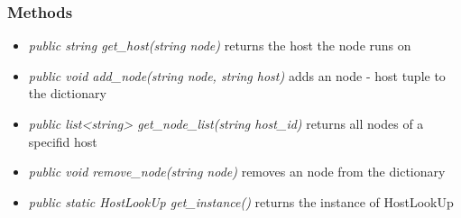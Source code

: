 \subsubsection{Methods}
\begin{itemize}
	\item \textit{ public string get\_host(string node) }
		returns the host the node runs on
	\item \textit{ public void add\_node(string node, string host) }
		adds an node - host tuple to the dictionary
	\item \textit{ public list<string> get\_node\_list(string host\_id) }
		returns all nodes of a specifid host
	\item \textit{ public void remove\_node(string node) }
		removes an node from the dictionary
	\item \textit{ public static HostLookUp get\_instance() }
		returns the instance of HostLookUp
\end{itemize}